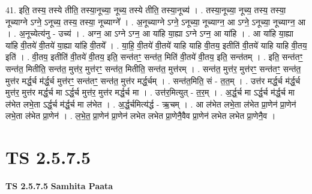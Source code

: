 \documentclass[17pt]{extarticle}
\begin{document}
41. इति॒ तस्य॒ तस्ये तीति॒ तस्या॒नूच्या॒ नूच्य॒ तस्ये तीति॒ तस्या॒नूच्य॑ । . तस्या॒नूच्या॒ नूच्य॒ तस्य॒ तस्या॒ नूच्याग्ने ऽग्ने॒ ऽनूच्य॒ तस्य॒ तस्या॒ नूच्याग्ने᳚ । . अ॒नूच्याग्ने ऽग्ने॒ ऽनूच्या॒ नूच्याग्न॒ आ ऽग्ने॒ ऽनूच्या॒ नूच्याग्न॒ आ । . अ॒नूच्येत्य॑नु - उच्य॑ । . अग्न॒ आ ऽग्ने ऽग्न॒ आ या॑हि या॒ह्या ऽग्ने ऽग्न॒ आ या॑हि । . आ या॑हि या॒ह्या या॑हि वी॒तये॑ वी॒तये॑ या॒ह्या या॑हि वी॒तये᳚ । . या॒हि॒ वी॒तये॑ वी॒तये॑ याहि याहि वी॒तय॒ इतीति॑ वी॒तये॑ याहि याहि वी॒तय॒ इति॑ । . वी॒तय॒ इतीति॑ वी॒तये॑ वी॒तय॒ इति॒ सन्त॑तꣳ॒॒ सन्त॑त॒ मिति॑ वी॒तये॑ वी॒तय॒ इति॒ सन्त॑तम् । . इति॒ सन्त॑तꣳ॒॒ सन्त॑त॒ मितीति॒ सन्त॑त॒ मुत्त॑र॒ मुत्त॑रꣳ॒॒ सन्त॑त॒ मितीति॒ सन्त॑त॒ मुत्त॑रम् । . सन्त॑त॒ मुत्त॑र॒ मुत्त॑रꣳ॒॒ सन्त॑तꣳ॒॒ सन्त॑त॒ मुत्त॑र मर्द्ध॒र्च म॑र्द्ध॒र्च मुत्त॑रꣳ॒॒ सन्त॑तꣳ॒॒ सन्त॑त॒ मुत्त॑र मर्द्ध॒र्चम् । . सन्त॑त॒मिति॒ सं - त॒त॒म् । . उत्त॑र मर्द्ध॒र्च म॑र्द्ध॒र्च मुत्त॑र॒ मुत्त॑र मर्द्ध॒र्च मा ऽर्द्ध॒र्च मुत्त॑र॒ मुत्त॑र मर्द्ध॒र्च मा । . उत्त॑र॒मित्युत् - त॒र॒म् । . अ॒र्द्ध॒र्च मा ऽर्द्ध॒र्च म॑र्द्ध॒र्च मा ल॑भेत लभे॒ता ऽर्द्ध॒र्च म॑र्द्ध॒र्च मा ल॑भेत । . अ॒र्द्ध॒र्चमित्य॑र्द्ध - ऋ॒चम् । . आ ल॑भेत लभे॒ता ल॑भेत प्रा॒णेन॑ प्रा॒णेन॑ लभे॒ता ल॑भेत प्रा॒णेन॑ । . ल॒भे॒त॒ प्रा॒णेन॑ प्रा॒णेन॑ लभेत लभेत प्रा॒णेनै॒वैव प्रा॒णेन॑ लभेत लभेत प्रा॒णेनै॒व । \newline
\pagebreak
{}
\section*{ TS 2.5.7.5 }

\textbf{TS 2.5.7.5 } \newline
\textbf{Samhita Paata} \newline
\end{document}
